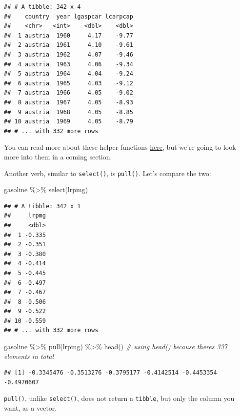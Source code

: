 \documentclass[
]{article}
\newenvironment{Shaded}{\begin{snugshade}}{\end{snugshade}}
\newcommand{\CommentTok}[1]{\textcolor[rgb]{0.56,0.35,0.01}{\textit{#1}}}
\newcommand{\FunctionTok}[1]{\textcolor[rgb]{0.00,0.00,0.00}{#1}}
\newcommand{\NormalTok}[1]{#1}
\newcommand{\SpecialCharTok}[1]{\textcolor[rgb]{0.00,0.00,0.00}{#1}}
\begin{document}
\begin{verbatim}
## # A tibble: 342 x 4
##    country  year lgaspcar lcarpcap
##    <chr>   <int>    <dbl>    <dbl>
##  1 austria  1960     4.17    -9.77
##  2 austria  1961     4.10    -9.61
##  3 austria  1962     4.07    -9.46
##  4 austria  1963     4.06    -9.34
##  5 austria  1964     4.04    -9.24
##  6 austria  1965     4.03    -9.12
##  7 austria  1966     4.05    -9.02
##  8 austria  1967     4.05    -8.93
##  9 austria  1968     4.05    -8.85
## 10 austria  1969     4.05    -8.79
## # ... with 332 more rows
\end{verbatim}

You can read more about these helper functions \href{https://tidyselect.r-lib.org/reference/language.html}{here}, but we're going to look more into
them in a coming section.

Another verb, similar to \texttt{select()}, is \texttt{pull()}. Let's compare the two:

\begin{Shaded}
\begin{Highlighting}[]
\NormalTok{gasoline }\SpecialCharTok{\%\textgreater{}\%}
  \FunctionTok{select}\NormalTok{(lrpmg)}
\end{Highlighting}
\end{Shaded}

\begin{verbatim}
## # A tibble: 342 x 1
##     lrpmg
##     <dbl>
##  1 -0.335
##  2 -0.351
##  3 -0.380
##  4 -0.414
##  5 -0.445
##  6 -0.497
##  7 -0.467
##  8 -0.506
##  9 -0.522
## 10 -0.559
## # ... with 332 more rows
\end{verbatim}

\begin{Shaded}
\begin{Highlighting}[]
\NormalTok{gasoline }\SpecialCharTok{\%\textgreater{}\%}
  \FunctionTok{pull}\NormalTok{(lrpmg) }\SpecialCharTok{\%\textgreater{}\%}
  \FunctionTok{head}\NormalTok{() }\CommentTok{\# using head() because there\textquotesingle{}s 337 elements in total}
\end{Highlighting}
\end{Shaded}

\begin{verbatim}
## [1] -0.3345476 -0.3513276 -0.3795177 -0.4142514 -0.4453354 -0.4970607
\end{verbatim}

\texttt{pull()}, unlike \texttt{select()}, does not return a \texttt{tibble}, but only the column you want, as a
vector.
\end{document}
